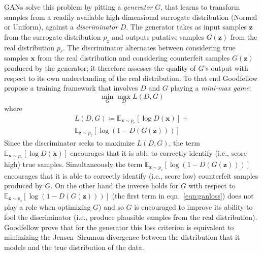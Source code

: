 GANs solve this problem by pitting a \textit{generator} \(G\), that learns to transform samples from a readily available high-dimensional surrogate distribution (Normal or Uniform), against a \textit{discriminator} \(D\).
The generator takes as input samples \(\bm{z}\) from the surrogate distribution \(p_{z}\) and outputs putative samples \(G(\bm{z})\) from the real distribution \(p_r\).
%
The discriminator alternates between considering true samples \(\bm{x}\) from the real distribution and considering counterfeit samples \(G(\bm{z})\) produced by the generator; it therefore assesses the quality of \(G\)'s output with respect to its own understanding of the real distribution.
%
To that end Goodfellow \etal \cite{goodfellow2014generative} propose a training framework that involves \(D\) and \(G \) playing a \textit{mini-max game}:
\begin{equation}
    \min_G \max_D L(D, G)
\end{equation}
where
\begin{multline}
    L(D, G) \coloneqq \mathbb{E}_{\bm{x} \sim p_{r}} [\log D(\bm{x})] + \\ \mathbb{E}_{\bm{z} \sim p_{z} } [\log(1 - D(G(\bm{z})))]
    \label{eqn:ganloss}
\end{multline}
Since the discriminator seeks to maximize \(L(D, G)\), the term \(\mathbb{E}_{\bm{x} \sim p_{r}} [\log D(\bm{x})]\) encourages that it is able to correctly identify (i.e., score high) true samples.
%
Simultaneously the term \(\mathbb{E}_{\bm{z} \sim p_{z} } [\log(1 - D(G(\bm{z})))] \) encourages that it is able to correctly identify (i.e., score low) counterfeit samples produced by \(G\).
%
On the other hand the inverse holds for \(G\) with respect to \(\mathbb{E}_{\bm{z} \sim p_{z} } [\log(1 - D(G(\bm{z})))]\) (the first term in eqn.~\eqref{eqn:ganloss}) does not play a role when optimizing \(G\)) and so \(G\) is encouraged to improve its ability to fool the discriminator (i.e., produce plausible samples from the real distribution).
%
Goodfellow \etal prove that for the generator this loss criterion is equivalent to minimizing the Jensen–Shannon divergence between the distribution that it models and the true distribution of the data.

